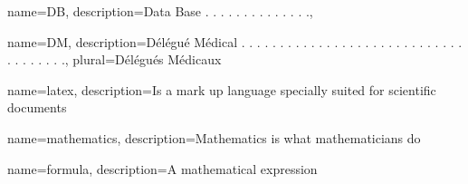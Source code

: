 \usepackage[acronym, toc]{glossaries}

\makeglossaries
{}%
{name={DB},%
description={Data Base . . . . . . . . . . . . . .},%
}

{name={DM},%
description={Délégué Médical . . . . . . . . . . . . . . . . . . . . . . . . . . . . . . . . . . . . .},%
plural={Délégués Médicaux}
}

{
        name=latex,
        description={Is a mark up language specially suited for 
scientific documents}
}
 
{
        name=mathematics,
        description={Mathematics is what mathematicians do}
}
 
{
        name=formula,
        description={A mathematical expression}
}


